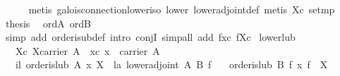 \begin{isabellebody}
\ \ \ \ \isamarkupfalse%
\ {}metis\ galois{}connection{}lower{}iso\ lower\ lower{}adjoint{}def{}\ metis\ Xc\ set{}mp{}\isanewline
\isanewline
\ \ \isamarkupfalse%
\ {}thesis\ \isamarkupfalse%
\ ord{}A\ ord{}B\isanewline
\ \ \ \ \isamarkupfalse%
\ {}simp\ add{}\ order{}is{}ub{}def{}\ intro\ conjI{}\ simp{}all\ add{}\ fxc\ fXc{}\isanewline
{}\isamarkupfalse%
%
\endisatagproof
{\isafoldproof}%
%
\isadelimproof
\isanewline
%
\endisadelimproof
\isanewline
{}\isamarkupfalse%
\ lower{}lub{}\isanewline
\ \ \ Xc{}\ {}X{}carrier\ A{}\ \ xc{}\ {}x\ {}\ carrier\ A{}\isanewline
\ \ \ il{}\ {}order{}is{}lub\ A\ x\ X{}\ \ la{}\ {}lower{}adjoint\ A\ B\ f{}\isanewline
\ \ \ {}order{}is{}lub\ B\ {}f\ x{}\ {}f\ {}\ X{}{}\isanewline

\end{isabellebody}

